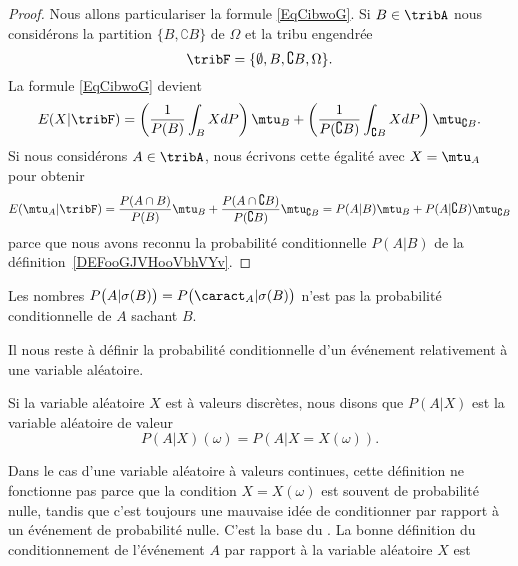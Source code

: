 \begin{proof}
	Nous allons particulariser la formule \eqref{EqCibwoG}. Si \( B\in \tribA\) nous considérons la partition \( \{ B,\complement B \}\) de \( \Omega\) et la tribu engendrée
	\begin{equation}
		\tribF=\{ \emptyset,B,\complement B,\Omega \}.
	\end{equation}
	La formule \eqref{EqCibwoG} devient
	\begin{equation}
		E(X|\tribF)=\left( \frac{1}{ P(B) }\int_BXdP \right)\mtu_B+\left( \frac{1}{ P(\complement B) }\int_{\complement B}XdP \right)\mtu_{\complement B}.
	\end{equation}
	Si nous considérons \( A\in\tribA\), nous écrivons cette égalité avec \( X=\mtu_A\) pour obtenir
	\begin{equation}
		E(\mtu_A|\tribF)=\frac{ P(A\cap B) }{ P(B) }\mtu_B+\frac{ P(A\cap\complement B) }{ P(\complement B) }\mtu_{\complement B} =P(A|B)\mtu_B+P(A|\complement B)\mtu_{\complement B}
	\end{equation}
	parce que nous avons reconnu la probabilité conditionnelle \( P(A|B)\) de la définition~\ref{DEFooGJVHooVbhVYv}.
\end{proof}

\begin{remark}
	Les nombres \(P\big( A |\sigma(B) \big)=P\big(\caract_A|\sigma(B)\big)\) n'est pas la probabilité conditionnelle de \( A\) sachant \( B\).
\end{remark}



Il nous reste à définir la probabilité conditionnelle d'un événement relativement à une variable aléatoire.

\begin{definition}      \label{DEFooFRLFooNvXuPK}
	Si la variable aléatoire \( X\) est à valeurs discrètes, nous disons que \( P(A|X)\) est la variable aléatoire de valeur
	\begin{equation}
		P(A|X)(\omega)=P(A|X=X(\omega)).
	\end{equation}
\end{definition}
Dans le cas d'une variable aléatoire à valeurs continues, cette définition ne fonctionne pas parce que la condition \( X=X(\omega)\) est souvent de probabilité nulle, tandis que c'est toujours une mauvaise idée de conditionner par rapport à un événement de probabilité nulle. C'est la base du . La bonne définition du conditionnement de l'événement \( A\) par rapport à la variable aléatoire \( X\) est

